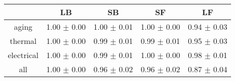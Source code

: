 \begin{tabular}{c c c c c }
\hline
 & LB & SB & SF & LF \\
\hline
aging & 1.00 $\pm$ 0.00 & 1.00 $\pm$ 0.01 & 1.00 $\pm$ 0.00 & 0.94 $\pm$ 0.03 \\
thermal & 1.00 $\pm$ 0.00 & 0.99 $\pm$ 0.01 & 0.99 $\pm$ 0.01 & 0.95 $\pm$ 0.03 \\
electrical & 1.00 $\pm$ 0.00 & 0.99 $\pm$ 0.01 & 1.00 $\pm$ 0.00 & 0.98 $\pm$ 0.01 \\
all & 1.00 $\pm$ 0.00 & 0.96 $\pm$ 0.02 & 0.96 $\pm$ 0.02 & 0.87 $\pm$ 0.04 \\
\hline
\end{tabular}